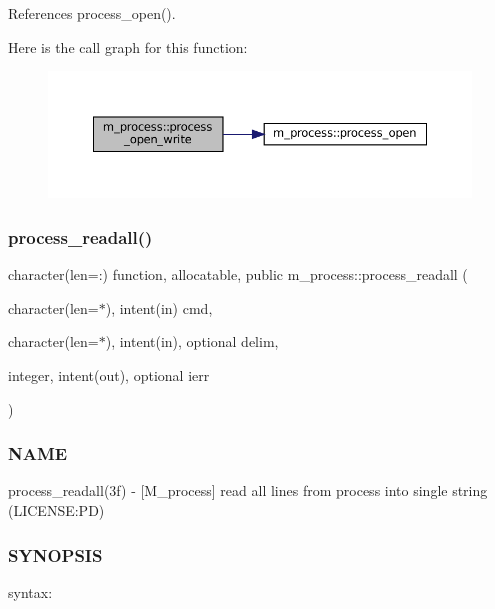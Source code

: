 References process\+\_\+open().

Here is the call graph for this function\+:\nopagebreak
\begin{figure}[H]
\begin{center}
\leavevmode
\includegraphics[width=350pt]{namespacem__process_aa6ed1404ab3472f5068ed15a7a01defc_cgraph}
\end{center}
\end{figure}
\mbox{\label{namespacem__process_a7dd759a1344789477ae1e205d7fa9a51}} 
\subsubsection{\texorpdfstring{process\+\_\+readall()}{process\_readall()}}
{\footnotesize\ttfamily character(len=\+:) function, allocatable, public m\+\_\+process\+::process\+\_\+readall (\begin{DoxyParamCaption}\item[{character(len=$\ast$), intent(in)}]{cmd,  }\item[{character(len=$\ast$), intent(in), optional}]{delim,  }\item[{integer, intent(out), optional}]{ierr }\end{DoxyParamCaption})}



\subsubsection*{N\+A\+ME}

process\+\_\+readall(3f) -\/ \mbox{[}M\+\_\+process\mbox{]} read all lines from process into single string (L\+I\+C\+E\+N\+SE\+:PD) \subsubsection*{S\+Y\+N\+O\+P\+S\+IS}

syntax\+:

